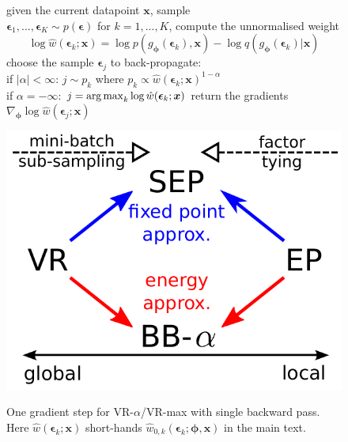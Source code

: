 \begin{figure}[!t]
\begin{minipage}[b]{0.5\linewidth}
\centering
\begin{algorithm}[H] 
\caption{One gradient step for VR-$\alpha$/VR-max with single backward pass. Here $\hat{w}(\bm{\epsilon}_k; \bm{x})$ short-hands $\hat{w}_{0, k}(\bm{\epsilon}_k; \bm{\phi}, \bm{x})$ in the main text.} \small
\label{alg:vr_max} 
\begin{algorithmic}[1] 
	\STATE given the current datapoint $\bm{x}$, sample \\$\bm{\epsilon}_1, ..., \bm{\epsilon}_K \sim p(\bm{\epsilon})$
	\STATE for $k = 1, ..., K$, compute the unnormalised weight
	$$\log \hat{w}(\bm{\epsilon}_k; \bm{x}) = \log p(g_{\bm{\phi}}(\bm{\epsilon}_k), \bm{x}) - \log q(g_{\bm{\phi}}(\bm{\epsilon}_k)|\bm{x})$$
	\STATE choose the sample $\bm{\epsilon}_{j}$ to back-propagate: \\
	if $|\alpha| < \infty$: $j \sim p_k$ where $p_k \propto \hat{w}(\bm{\epsilon}_k; \bm{x})^{1 - \alpha}$ \\
	if $\alpha = -\infty$: $j = \operatorname*{arg\,max}_{k} \log \hat{w}(\bm{\epsilon}_k; \bm{x})$ 
	\STATE return the gradients $\nabla_{\bm{\phi}} \log \hat{w}(\bm{\epsilon}_{j}; \bm{x})$
\end{algorithmic}
\end{algorithm}
\end{minipage}
%
\hfill
\begin{minipage}[b]{0.4\linewidth}
\centering
 \includegraphics[width=0.9\linewidth]{figs/vr_ep_relationship.pdf} 
 \vspace{-0.1in}
 \label{fig:vr_ep_relationship}
\end{minipage}
%
\end{figure}

